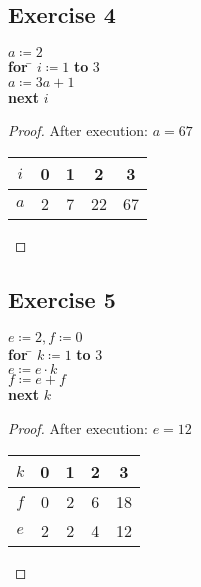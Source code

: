 \documentclass[14pt]{extarticle}
\begin{document}
\subsection{Exercise 4}
\begin{tabbing}
    $a \coloneqq 2$ \\
    {\bf for} \= $i \coloneqq 1$ {\bf to} 3 \\
    \> $a \coloneqq 3a + 1$ \\
    {\bf next} $i$
\end{tabbing}

\begin{proof}
    After execution: $a = 67$
    \begin{center}
        \begin{tabular}{|c|c|c|c|c|}
            \hline
            $i$ & 0 & 1 & 2  & 3  \\
            \hline
            $a$ & 2 & 7 & 22 & 67 \\
            \hline
        \end{tabular}
    \end{center}
\end{proof}

\subsection{Exercise 5}
\begin{tabbing}
    $e \coloneqq 2, f \coloneqq 0$ \\
    {\bf for} \= $k \coloneqq 1$ {\bf to} 3 \\
    \> $e \coloneqq e \cdot k $ \\
    \> $f \coloneqq e + f$ \\
    {\bf next} $k$
\end{tabbing}

\begin{proof}
    After execution: $e = 12$
    \begin{center}
        \begin{tabular}{|c|c|c|c|c|}
            \hline
            $k$ & 0 & 1 & 2 & 3  \\
            \hline
            $f$ & 0 & 2 & 6 & 18 \\
            \hline
            $e$ & 2 & 2 & 4 & 12 \\
            \hline
        \end{tabular}
    \end{center}
\end{proof}
\end{document}

